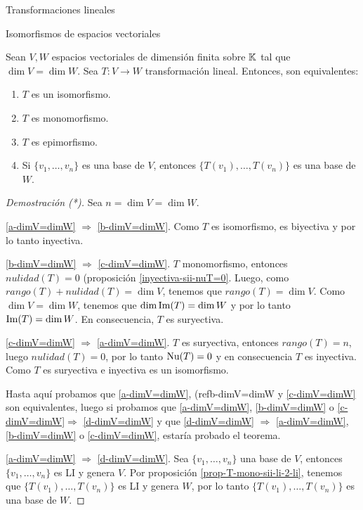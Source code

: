 \begin{chapter}{Transformaciones lineales}
\begin{section}{Isomorfismos de espacios vectoriales}
        \begin{teorema}
            Sean $V,W$ espacios vectoriales de dimensión  finita sobre $\mathbb K$ tal que $\dim V = \dim W$. Sea $T: V \to W$ transformación lineal. Entonces,  son equivalentes:
            \begin{enumerate}[label=\textit{\alph*)},ref=\textit{\alph*)}]
                \item\label{a-dimV=dimW} $T$ es un  isomorfismo.
                \item\label{b-dimV=dimW} $T$ es monomorfismo.
                \item\label{c-dimV=dimW} $T$ es epimorfismo.
                \item\label{d-dimV=dimW} Si $\{v_1,\ldots,v_n \}$ es una base de $V$,  entonces $\{T(v_1),\ldots,T(v_n) \}$ es una base de $W$.
            \end{enumerate}
        \end{teorema}
        \begin{proof}[Demostración (*)] Sea $n = \dim V = \dim W$.
            
            
            \ref{a-dimV=dimW} $\Rightarrow$ \ref{b-dimV=dimW}. Como $T$ es isomorfismo,  es biyectiva y por lo tanto inyectiva.
            
            \ref{b-dimV=dimW} $\Rightarrow$ 
            \ref{c-dimV=dimW}. $T$ monomorfismo,  entonces $nulidad(T) = 0$ (proposición \ref{inyectiva-sii-nuT=0}. Luego, como  $rango(T) +nulidad(T) = \dim V$,  tenemos que $rango(T) = \dim V$. Como $\dim V = \dim W$, tenemos que $\dim \operatorname{Im}(T) = \dim W$ y por lo tanto $\operatorname{Im}(T) = \dim W$. En  consecuencia, $T$ es suryectiva.
            
            \ref{c-dimV=dimW} $\Rightarrow$ \ref{a-dimV=dimW}. $T$ es suryectiva, entonces $rango(T) = n$, luego  $nulidad(T) = 0$, por lo tanto $\operatorname{Nu}(T)=0$ y en consecuencia $T$ es inyectiva. Como $T$ es suryectiva e inyectiva  es un isomorfismo. 
            
            Hasta aquí probamos que \ref{a-dimV=dimW}, (ref{b-dimV=dimW} y \ref{c-dimV=dimW} son equivalentes, luego si probamos que \ref{a-dimV=dimW}, \ref{b-dimV=dimW} o \ref{c-dimV=dimW}$\Rightarrow$ \ref{d-dimV=dimW} y que \ref{d-dimV=dimW} $\Rightarrow$ \ref{a-dimV=dimW}, \ref{b-dimV=dimW} o \ref{c-dimV=dimW}, estaría probado el teorema. 
            
            \ref{a-dimV=dimW} $\Rightarrow$ \ref{d-dimV=dimW}. Sea $\{v_1,\ldots,v_n \}$  una base de $V$,  entonces $\{v_1,\ldots,v_n \}$ es LI y  genera $V$. Por proposición \ref{prop-T-mono-sii-li-2-li}, tenemos que $\{T(v_1),\ldots,T(v_n) \}$ es LI y  genera $W$, por lo tanto $\{T(v_1),\ldots,T(v_n) \}$ es una base de $W$.
            

\end{proof}
\end{section}
\end{chapter}
